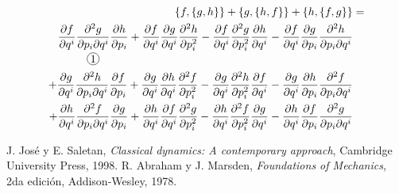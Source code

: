 \documentclass[a4paper,10pt]{article}
\numberwithin{equation}{section}
\newcommand{\circled}[2][]{%
  \tikz[baseline=(char.base)]{%
    \node[shape = circle, draw, inner sep = 1pt]
    (char) {\phantom{\ifblank{#1}{#2}{#1}}};%
    \node at (char.center) {\makebox[0pt][c]{#2}};}}
\begin{document}
\begin{align}
\begin{split}
  \{f,\{g,h\}\} + \{g,\{h,f\}\} + \{h,\{f,g\}\} &= \\
  \underset{\circled{1}}{\frac{\partial f}{\partial q^i}
  \frac{\partial^2 g}{\partial p_i\partial q^i}\frac{\partial h}{\partial p_i}}
  + \frac{\partial f}{\partial q^i}
  \frac{\partial g}{\partial q^i}\frac{\partial^2 h}{\partial p_i^2} 
  -\frac{\partial f}{\partial q^i}
  \frac{\partial^2 g}{\partial p_i^2}\frac{\partial h}{\partial q^i} 
  -\frac{\partial f}{\partial q^i} 
  \frac{\partial g}{\partial p_i}\frac{\partial^2 h}{\partial p_i \partial q^i} \\
  + \frac{\partial g}{\partial q^i}
  \frac{\partial^2 h}{\partial p_i\partial q^i}\frac{\partial f}{\partial p_i} 
  + \frac{\partial g}{\partial q^i}
  \frac{\partial h}{\partial q^i}\frac{\partial^2 f}{\partial p_i^2} 
  -\frac{\partial g}{\partial q^i}
  \frac{\partial^2 h}{\partial p_i^2}\frac{\partial f}{\partial q^i} 
  -\frac{\partial g}{\partial q^i} 
  \frac{\partial h}{\partial p_i}\frac{\partial^2 f}{\partial p_i \partial q^i} \\
  + \frac{\partial h}{\partial q^i}
  \frac{\partial^2 f}{\partial p_i\partial q^i}\frac{\partial g}{\partial p_i} 
  + \frac{\partial h}{\partial q^i}
  \frac{\partial f}{\partial q^i}\frac{\partial^2 g}{\partial p_i^2} 
  -\frac{\partial h}{\partial q^i}
  \frac{\partial^2 f}{\partial p_i^2}\frac{\partial g}{\partial q^i} 
  -\frac{\partial h}{\partial q^i} 
  \frac{\partial f}{\partial p_i}\frac{\partial^2 g}{\partial p_i \partial q^i}
\end{split}
\end{align}


\begin{thebibliography}{20}
 J. José y E. Saletan, \emph{Classical dynamics: A contemporary approach}, Cambridge University Press,
 1998.
 R. Abraham y J. Marsden, \emph{Foundations of Mechanics}, 2da edición, Addison-Wesley,
 1978.
\end{thebibliography}
\end{document}
